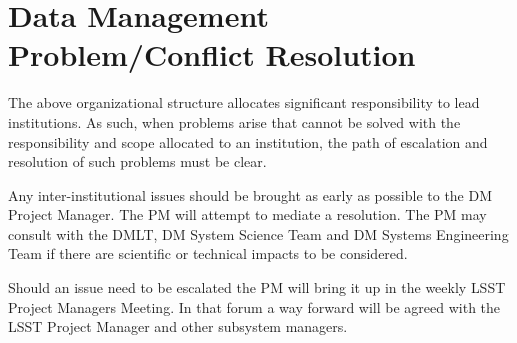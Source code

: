 \section{Data Management Problem/Conflict Resolution }
The above organizational structure allocates significant responsibility to lead institutions.
As such, when problems arise that cannot be solved with the responsibility and scope allocated to an institution, the path of escalation and resolution of such problems must be clear.

Any inter-institutional issues should be brought as early as possible to the \gls{DM} \gls{Project Manager}.
The \gls{PM} will attempt to mediate a resolution.
The \gls{PM} may consult with the \gls{DMLT}, DM System Science Team and DM \gls{Systems Engineering} Team if there are scientific or technical impacts to be considered.

Should an issue need to be escalated the \gls{PM} will bring it up in the weekly \gls{LSST} Project Managers Meeting.
In that forum a way forward will be agreed with the \gls{LSST} \gls{Project Manager} and other subsystem managers.
